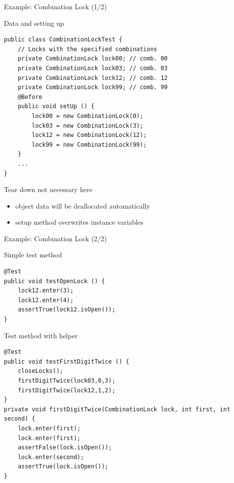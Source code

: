 \begin{frame}[fragile]{Example: Combination Lock (1/2)}
  \begin{block}{Data and setting up}
    \begin{Verbatim}
public class CombinationLockTest {
    // Locks with the specified combinations
    private CombinationLock lock00; // comb. 00
    private CombinationLock lock03; // comb. 03
    private CombinationLock lock12; // comb. 12
    private CombinationLock lock99; // comb. 99
    @Before
    public void setUp () {
        lock00 = new CombinationLock(0);
        lock03 = new CombinationLock(3);
        lock12 = new CombinationLock(12);
        lock99 = new CombinationLock(99);
    }
    ...
}      
    \end{Verbatim}
  \end{block}

  \begin{block}{Tear down not necessary here}
    \begin{itemize}
    \item object data will be deallocated automatically
    \item setup method overwrites instance variables
    \end{itemize}
  \end{block}
\end{frame}
\begin{frame}[fragile]{Example: Combination Lock (2/2)}
  \begin{block}{Simple test method}
    \begin{Verbatim}
@Test
public void testOpenLock () {
    lock12.enter(3);
    lock12.enter(4);
    assertTrue(lock12.isOpen());
}      
    \end{Verbatim}
  \end{block}

  \begin{block}{Test method with helper}
    \begin{Verbatim}
@Test
public void testFirstDigitTwice () {
    closeLocks();
    firstDigitTwice(lock03,0,3);
    firstDigitTwice(lock12,1,2);
}
private void firstDigitTwice(CombinationLock lock, int first, int second) {
    lock.enter(first);
    lock.enter(first);
    assertFalse(lock.isOpen());
    lock.enter(second);
    assertTrue(lock.isOpen());
}
    \end{Verbatim}
  \end{block}
\end{frame}
